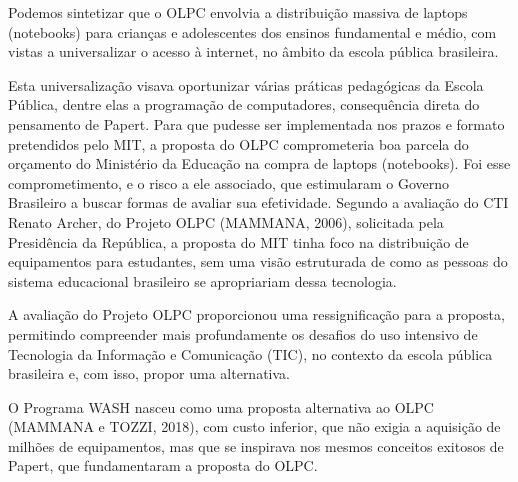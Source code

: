 \documentclass[
12pt,		%
openright,	%
twoside,  %
a4paper,			%
chapter=TITLE,		%
english,			%
french,				%
spanish,			%
brazil				%
]{USPSC-classe/USPSC}
\begin{document}
Podemos sintetizar que o OLPC envolvia a distribui\c{c}\~ao massiva de laptops (notebooks) para crian\c{c}as e adolescentes dos ensinos fundamental e m\'edio, com vistas a universalizar o acesso \`a internet, no \^ambito da escola p\'ublica brasileira.

















Esta universaliza\c{c}\~ao visava oportunizar v\'arias pr\'aticas pedag\'ogicas da Escola P\'ublica, dentre elas a programa\c{c}\~ao de computadores, consequ\^encia direta do pensamento de Papert. Para que pudesse ser implementada nos prazos e formato pretendidos pelo MIT, a proposta do OLPC comprometeria boa parcela do or\c{c}amento do Minist\'erio da Educa\c{c}\~ao na compra de laptops (notebooks). Foi esse comprometimento, e o risco a ele associado, que estimularam o Governo Brasileiro a buscar formas de avaliar sua efetividade. Segundo a avalia\c{c}\~ao do CTI Renato Archer, do Projeto OLPC  (MAMMANA, 2006), solicitada pela Presid\^encia da Rep\'ublica, a proposta do MIT tinha foco na distribui\c{c}\~ao de equipamentos para estudantes, sem uma vis\~ao estruturada de como as pessoas do sistema educacional brasileiro se apropriariam dessa tecnologia.

















A avalia\c{c}\~ao do Projeto OLPC proporcionou uma ressignifica\c{c}\~ao para a proposta, permitindo compreender mais profundamente os desafios do uso intensivo de Tecnologia da Informa\c{c}\~ao e Comunica\c{c}\~ao (TIC), no contexto da escola p\'ublica brasileira e, com isso, propor uma alternativa.

















O Programa WASH nasceu como uma proposta alternativa ao OLPC (MAMMANA e TOZZI, 2018), com custo inferior, que n\~ao exigia a aquisi\c{c}\~ao de milh\~oes de equipamentos, mas que se inspirava nos mesmos conceitos exitosos de Papert, que fundamentaram a proposta do OLPC.
\end{document}
